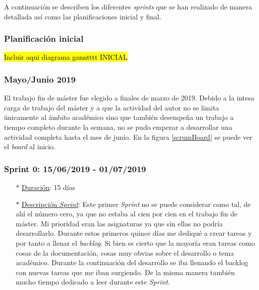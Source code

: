 A continuación se describen los diferentes \emph{sprints} que se han realizado de manera detallada así como las planificaciones inicial y final.

\subsubsection{Planificación inicial}

 \hl{Incluir aqui diagrama ganntttt INICIAL}


\subsubsection{Mayo/Junio 2019}\label{previo}
El trabajo fin de máster fue elegido a finales de marzo de 2019. Debido a la intesa carga de trabajo del máster y a que la actividad del autor no se limita únicamente al ámbito académico sino que también desempeña un trabajo a tiempo completo durante la semana, no se pudo empezar a desarrollar una actividad completa hasta el mes de junio. 
En la figura \ref{scrumBoard} se puede ver el \textit{board} al inicio.


\subsubsection{Sprint 0: 15/06/2019 - 01/07/2019}\label{sprint0}
\begin{itemize}
	\item[$\ast$] \underline{Duración}:  15 días
	\item[$\ast$] \underline{Descripción \textit{Sprint}}: Este primer \textit{Sprint} no se puede considerar como tal, de ahí el número cero, ya que no estaba al cien por cien en el trabajo fin de máster. Mi prioridad eran las asignaturas ya que sin ellas no podría desarrollarlo. Durante estos primeros quince días me dediqué a crear tareas y por tanto a llenar el \textit{backlog}. Si bien es cierto que la mayoría eran tareas como cosas de la documentación, cosas muy obvias sobre el desarrollo o tema académico. Durante la continuación del desarrollo se iba llenando el backlog con nuevas tareas que me iban surgiendo. De la misma manera también mucho tiempo dedicado a leer durante este \textit{Sprint}.
\end{itemize}
